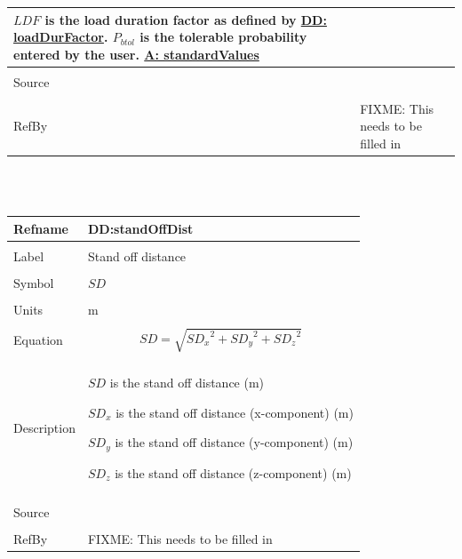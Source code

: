 \documentclass[12pt]{article}
\begin{document}
\begin{minipage}{\textwidth}
\begin{tabular}{p{} p{}}
        $LDF$ is the load duration factor as defined by \hyperref[DD:loadDurFactor]{DD: loadDurFactor}.
        ${P_{btol}}$ is the tolerable probability entered by the user.
        \hyperref[A:standardValues]{A: standardValues}
\\ \midrule \\
Source & \cite{astm2009}
\\ \midrule \\
RefBy & FIXME: This needs to be filled in
\\ \bottomrule \end{tabular}
\end{minipage}\\
~\newline
\noindent \begin{minipage}{\textwidth}
\begin{tabular}{p{} p{}}
\toprule \textbf{Refname} & \textbf{DD:standOffDist}
\label{DD:standOffDist}
\\ \midrule \\
Label & Stand off distance
\\ \midrule \\
Symbol & $SD$
\\ \midrule \\
Units & m
\\ \midrule \\
Equation & \begin{dmath}
           SD=\sqrt{{SD_{x}}^{2}+{SD_{y}}^{2}+{SD_{z}}^{2}}
           \end{dmath}
\\ \midrule \\
Description & \begin{symbDescription}
              \item{$SD$ is the stand off distance (m)}
              \item{${SD_{x}}$ is the stand off distance (x-component) (m)}
              \item{${SD_{y}}$ is the stand off distance (y-component) (m)}
              \item{${SD_{z}}$ is the stand off distance (z-component) (m)}
              \end{symbDescription}
\\ \midrule \\
Source & \cite{astm2009}
\\ \midrule \\
RefBy & FIXME: This needs to be filled in
\\ \bottomrule \end{tabular}
\end{minipage}\\
\end{document}
